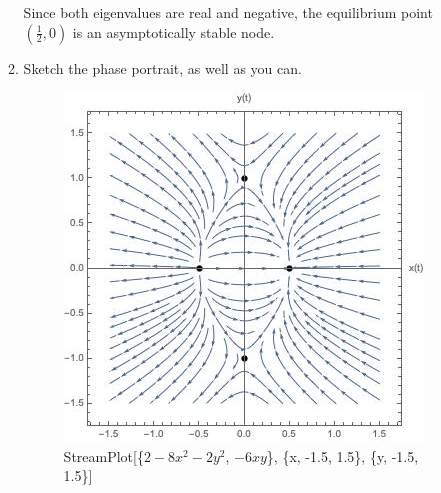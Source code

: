 \documentclass[12pt,letterpaper,reqno]{amsart}
\begin{document}
\begin{enumerate}
\begin{enumerate}
\begin{flushleft}
    Since both eigenvalues are real and negative, the equilibrium point $(\frac{1}{2}, 0)$ is an asymptotically stable node.\newline
    \end{flushleft}
    \item Sketch the phase portrait, as well as you can.\newline
    \begin{flushleft}
    \begin{figure}[h]
      \centering
      \includegraphics[width=.8\linewidth]{./HW6PhasePortrait.jpeg}
      \caption*{StreamPlot[\{$2 - 8 x^2 - 2 y^2$, $-6 x y$\}, \{x, -1.5, 1.5\}, \{y, -1.5, 1.5\}]}
    \end{figure}
    \end{flushleft}
\end{enumerate}
\end{enumerate}
\end{document}
